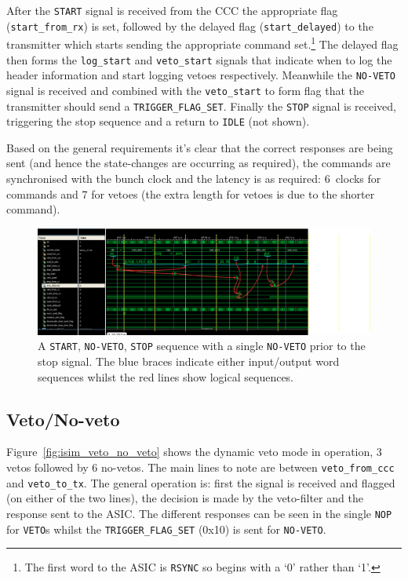 After the \texttt{START} signal is received from the CCC the appropriate flag (\texttt{start\_from\_rx}) is set, followed by the delayed flag (\texttt{start\_delayed}) to the transmitter which starts sending the appropriate command set.\footnote{The first word to the ASIC is \texttt{RSYNC} so begins with a `0' rather than `1'.} The delayed flag then forms the \texttt{log\_start} and \texttt{veto\_start} signals that indicate when to log the header information and start logging vetoes respectively. Meanwhile the \texttt{NO-VETO} signal is received and combined with the \texttt{veto\_start} to form flag that the transmitter should send a \texttt{TRIGGER\_FLAG\_SET}. Finally the \texttt{STOP} signal is received, triggering the stop sequence and a return to \texttt{IDLE} (not shown).

Based on the general requirements it's clear that the correct responses are being sent (and hence the state-changes are occurring as required), the commands are synchronised with the bunch clock and the latency is as required: 6~clocks for commands and 7 for vetoes (the extra length for vetoes is due to the shorter command).

\begin{figure}[htbp]
  \centering
  \includegraphics[width=\textwidth]{images/isim/edited/start-veto-stop.png}
  \caption{A \texttt{START}, \texttt{NO-VETO}, \texttt{STOP} sequence with a single \texttt{NO-VETO} prior to the stop signal. The blue braces indicate either input/output word sequences whilst the red lines show logical sequences.}
  \label{fig:isim_start-veto-stop}
\end{figure}
\subsection{Veto/No-veto} %
\label{sec:veto_no_veto}
Figure~\ref{fig:isim_veto_no_veto} shows the dynamic veto mode in operation, 3 vetos followed by 6 no-vetos. The main lines to note are between \texttt{veto\_from\_ccc} and \texttt{veto\_to\_tx}. The general operation is: first the signal is received and flagged (on either of the two lines), the decision is made by the veto-filter and the response sent to the ASIC. The different responses can be seen in the single \texttt{NOP} for \texttt{VETO}s whilst the \texttt{TRIGGER\_FLAG\_SET} (0x10) is sent for \texttt{NO-VETO}. 

